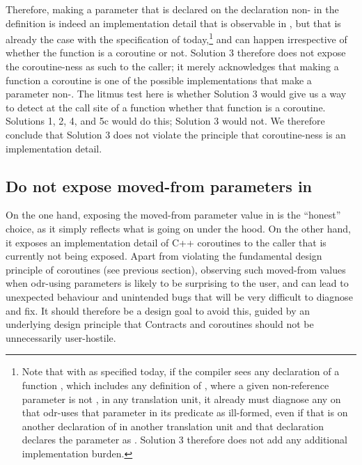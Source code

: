 Therefore, making a parameter that is declared  on the declaration non- in the definition is indeed an implementation detail that is observable in , but that is already the case with the specification of \cite{P2900R8} today,\footnote{Note that with \cite{P2900R8} as specified today, if the compiler sees any declaration of a function , which includes any definition of , where a given non-reference parameter is not , in any translation unit, it already must diagnose any  on  that odr-uses that parameter in its predicate as ill-formed, even if that  is on another declaration of  in another translation unit and that declaration declares the parameter as . Solution 3 therefore does not add any additional implementation burden.} and can happen irrespective of whether the function is a coroutine or not. Solution 3 therefore does not expose the coroutine-ness as such to the caller; it merely acknowledges that making a function a coroutine is one of the possible implementations that make a parameter non-. The litmus test here is whether Solution 3 would give us a way to detect at the call site of a function whether that function is a coroutine. Solutions 1, 2, 4, and 5c would do this; Solution 3 would not. We therefore conclude that Solution 3 does not violate the principle that coroutine-ness is an implementation detail.

\subsection{Do not expose moved-from parameters in }

On the one hand, exposing the moved-from parameter value in  is the ``honest'' choice, as it simply reflects what is going on under the hood. On the other hand, it exposes an implementation detail of C++ coroutines to the caller that is currently not being exposed. Apart from violating the fundamental design principle of coroutines (see previous section), observing such moved-from values when odr-using  parameters is likely to be surprising to the user, and can lead to unexpected behaviour and unintended bugs that will be very difficult to diagnose and fix. It should therefore be a design goal to avoid this, guided by an underlying design principle that Contracts and coroutines should not be unnecessarily user-hostile.

